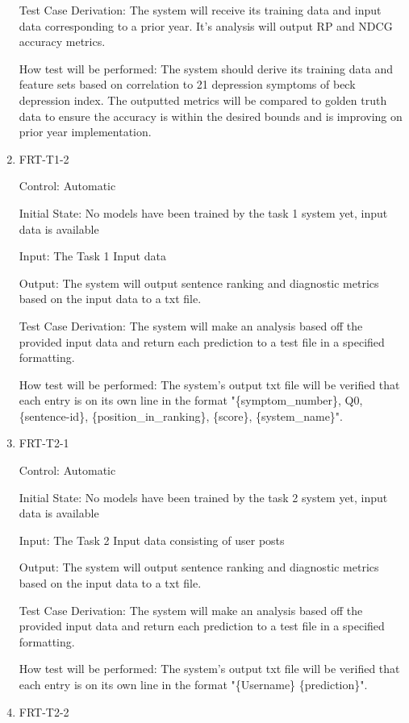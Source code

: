 \documentclass[12pt, titlepage]{article}
\begin{document}
\begin{enumerate}
Test Case Derivation: The system will receive its training data and input data corresponding to a prior year. It's analysis will output RP and NDCG accuracy metrics.

How test will be performed: The system should derive its training data and feature sets based on correlation to 21 depression symptoms of beck depression index. The outputted metrics will be compared to golden truth data to ensure the accuracy is within the desired bounds and is improving on prior year implementation.

\item{FRT-T1-2\\}

Control: Automatic

Initial State: No models have been trained by the task 1 system yet, input data is available

Input: The Task 1 Input data

Output: The system will output sentence ranking and diagnostic metrics based on the input data to a txt file.

Test Case Derivation: The system will make an analysis based off the provided input data and return each prediction to a test file in a specified formatting.

How test will be performed: The system's output txt file will be verified that each entry is on its own line in the format "\{symptom\_number\}, Q0, \{sentence-id\}, \{position\_in\_ranking\}, \{score\}, \{system\_name\}".

\item{FRT-T2-1\\}

Control: Automatic

Initial State: No models have been trained by the task 2 system yet, input data is available

Input: The Task 2 Input data consisting of user posts

Output: The system will output sentence ranking and diagnostic metrics based on the input data to a txt file.

Test Case Derivation: The system will make an analysis based off the provided input data and return each prediction to a test file in a specified formatting.

How test will be performed: The system's output txt file will be verified that each entry is on its own line in the format "\{Username\} \{prediction\}".

\item{FRT-T2-2\\}


\end{enumerate}
\end{document}

